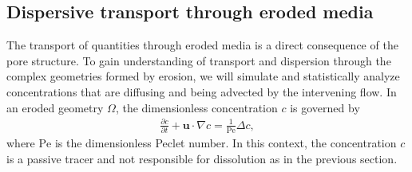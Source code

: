 \documentclass[11pt]{article}
\newcommand{\pd}[2]{ \frac{ \partial #1}{ \partial #2 } }
\newcommand{\bvec}[1]{{\mathbf{#1}}}
\newcommand{\Pe}{\mathrm{Pe}}
\newcommand{\uu}{\bvec{u}}
\begin{document}
\subsection{Dispersive transport through eroded media}

The transport of quantities through eroded media is a direct consequence of the pore structure. To gain understanding of transport and dispersion through the complex geometries formed by erosion, we will simulate and statistically analyze concentrations that are diffusing and being  advected by the intervening flow. In an eroded geometry $\Omega$, the dimensionless concentration $c$ is governed by
\begin{align}
  \pd{c}{t} + \uu \cdot \nabla c = \frac{1}{\Pe} \Delta c, 
  \label{eqn:advectionDiffusion}
\end{align}
where $\Pe$ is the dimensionless Peclet number. In this context, the concentration $c$ is a passive tracer and not responsible for dissolution as in the previous section. 
\end{document}
